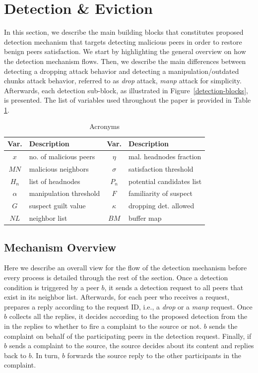 \section{Detection \& Eviction}
\label{sec:detection}

In this section, we describe the main building blocks that constitutes proposed detection mechanism that targets detecting malicious peers in order to restore benign peers satisfaction.
We start by highlighting the general overview on how the detection mechanism flows.
Then, we describe the main differences between detecting a dropping attack behavior and detecting a manipulation/outdated chunks attack behavior, referred to as \textit{drop} attack, \textit{manp} attack for simplicity.
Afterwards, each detection sub-block, as illustrated in Figure~\ref{detection-blocks}, is presented.
The list of variables used throughout the paper is provided in Table \ref{tab:acronyms}.

\begin{table}[ht]
\center
\caption{Acronyms}
\begin{tabular}{|c|l||c|l|}
\hline

\bf{Var.} & \bf{Description}  & \bf{Var.} & \bf{Description} \\\hline\hline
$x$ & no. of malicious peers & $\eta$ & mal. headnodes fraction\\\hline
$MN$ & malicious neighbors & $\sigma$ & satisfaction threshold\\\hline
$H_n$ & list of headnodes & $P_n$ & potential candidates list \\\hline
$\alpha$ & manipulation threshold& $F$ & familiarity of suspect \\\hline
$G$ & suspect guilt value & $\kappa$ & dropping det. allowed\\\hline
$NL$ & neighbor list & $BM$ & buffer map\\\hline
\end{tabular}
\label{tab:acronyms}
\end{table}

\subsection{Mechanism Overview}
Here we describe an overall view for the flow of the detection mechanism before every process is detailed through the rest of the section.
Once a detection condition is triggered by a peer $b$, it sends a detection request to all peers that exist in its neighbor list.
Afterwards, for each peer who receives a request, prepares a reply according to the request ID, i.e., a \textit{drop} or a \textit{manp} request.
Once $b$ collects all the replies, it decides according to the proposed detection from the  in the replies to whether to fire a complaint to the source or not.
$b$ sends the complaint on behalf of the participating peers in the detection request. 
Finally, if $b$ sends a complaint to the source, the source decides about its content and replies back to $b$. In turn, $b$ forwards the source reply to the other participants in the complaint.

